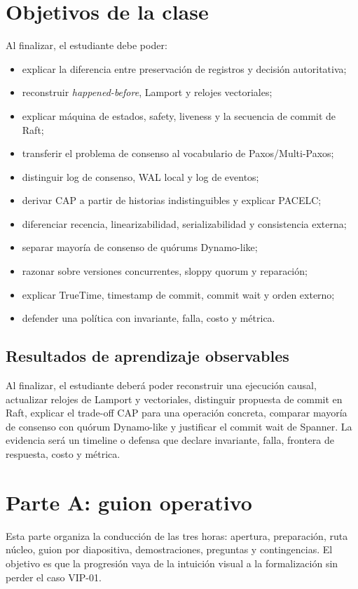 \documentclass[variant=docente,cover=institutional,mode=screen]{ua-engineering-v6-article}
\begin{document}
\section{Objetivos de la clase}
Al finalizar, el estudiante debe poder:
\begin{itemize}
\item explicar la diferencia entre preservación de registros y decisión autoritativa;
\item reconstruir \emph{happened-before}, Lamport y relojes vectoriales;
\item explicar máquina de estados, safety, liveness y la secuencia de commit de Raft;
\item transferir el problema de consenso al vocabulario de Paxos/Multi-Paxos;
\item distinguir log de consenso, WAL local y log de eventos;
\item derivar CAP a partir de historias indistinguibles y explicar PACELC;
\item diferenciar recencia, linearizabilidad, serializabilidad y consistencia externa;
\item separar mayoría de consenso de quórums Dynamo-like;
\item razonar sobre versiones concurrentes, sloppy quorum y reparación;
\item explicar TrueTime, timestamp de commit, commit wait y orden externo;
\item defender una política con invariante, falla, costo y métrica.
\end{itemize}

\subsection{Resultados de aprendizaje observables}
Al finalizar, el estudiante deberá poder reconstruir una ejecución causal, actualizar relojes de Lamport y vectoriales, distinguir propuesta de commit en Raft, explicar el trade-off CAP para una operación concreta, comparar mayoría de consenso con quórum Dynamo-like y justificar el commit wait de Spanner. La evidencia será un timeline o defensa que declare invariante, falla, frontera de respuesta, costo y métrica.

\section{Parte A: guion operativo}
Esta parte organiza la conducción de las tres horas: apertura, preparación, ruta núcleo, guion por diapositiva, demostraciones, preguntas y contingencias. El objetivo es que la progresión vaya de la intuición visual a la formalización sin perder el caso VIP-01.
\end{document}
